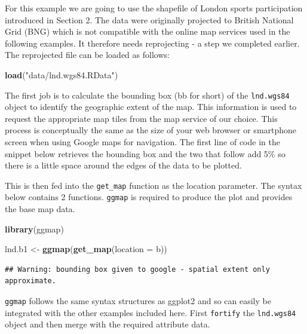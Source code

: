 \documentclass[]{article}
\newenvironment{Shaded}{}{}
\newcommand{\KeywordTok}[1]{\textcolor[rgb]{0.00,0.44,0.13}{\textbf{{#1}}}}
\newcommand{\DataTypeTok}[1]{\textcolor[rgb]{0.56,0.13,0.00}{{#1}}}
\newcommand{\DecValTok}[1]{\textcolor[rgb]{0.25,0.63,0.44}{{#1}}}
\newcommand{\FloatTok}[1]{\textcolor[rgb]{0.25,0.63,0.44}{{#1}}}
\newcommand{\StringTok}[1]{\textcolor[rgb]{0.25,0.44,0.63}{{#1}}}
\newcommand{\CommentTok}[1]{\textcolor[rgb]{0.38,0.63,0.69}{\textit{{#1}}}}
\newcommand{\NormalTok}[1]{{#1}}
\begin{document}
For this example we are going to use the shapefile of London sports
participation introduced in Section 2. The data were originally
projected to British National Grid (BNG) which is not compatible with
the online map services used in the following examples. It therefore
needs reprojecting - a step we completed earlier. The reprojected file
can be loaded as follows:

\begin{Shaded}
\begin{Highlighting}[]
\KeywordTok{load}\NormalTok{(}\StringTok{"data/lnd.wgs84.RData"}\NormalTok{)}
\end{Highlighting}
\end{Shaded}
The first job is to calculate the bounding box (bb for short) of the
\texttt{lnd.wgs84} object to identify the geographic extent of the map.
This information is used to request the appropriate map tiles from the
map service of our choice. This process is conceptually the same as the
size of your web browser or smartphone screen when using Google maps for
navigation. The first line of code in the snippet below retrieves the
bounding box and the two that follow add 5\% so there is a little space
around the edges of the data to be plotted.

\begin{Shaded}
\end{Shaded}
This is then fed into the \texttt{get\_map} function as the location
parameter. The syntax below contains 2 functions. \texttt{ggmap} is
required to produce the plot and provides the base map data.

\begin{Shaded}
\begin{Highlighting}[]
\KeywordTok{library}\NormalTok{(ggmap)}

\NormalTok{lnd.b1 <- }\KeywordTok{ggmap}\NormalTok{(}\KeywordTok{get_map}\NormalTok{(}\DataTypeTok{location =} \NormalTok{b))}
\end{Highlighting}
\end{Shaded}
\begin{verbatim}
## Warning: bounding box given to google - spatial extent only approximate.
\end{verbatim}
\texttt{ggmap} follows the same syntax structures as ggplot2 and so can
easily be integrated with the other examples included here. First
\texttt{fortify} the \texttt{lnd.wgs84} object and then merge with the
required attribute data.
\end{document}
